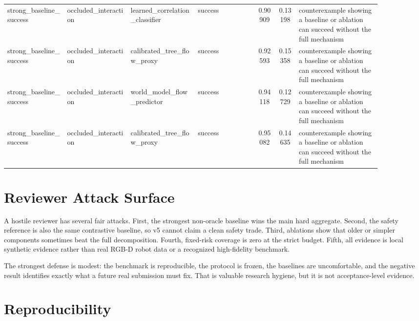 \documentclass{article}
\begin{document}
\begin{center}
\begin{longtable}{p{0.16\linewidth}p{0.17\linewidth}p{0.18\linewidth}p{0.16\linewidth}ccp{0.22\linewidth}}
strong\_baseline\_success & occluded\_interaction & learned\_correlation\_classifier & success & 0.90909 & 0.13198 & counterexample showing a baseline or ablation can succeed without the full mechanism\\
strong\_baseline\_success & occluded\_interaction & calibrated\_tree\_flow\_proxy & success & 0.92593 & 0.15358 & counterexample showing a baseline or ablation can succeed without the full mechanism\\
strong\_baseline\_success & occluded\_interaction & world\_model\_flow\_predictor & success & 0.94118 & 0.12729 & counterexample showing a baseline or ablation can succeed without the full mechanism\\
strong\_baseline\_success & occluded\_interaction & calibrated\_tree\_flow\_proxy & success & 0.95082 & 0.14635 & counterexample showing a baseline or ablation can succeed without the full mechanism\\
\bottomrule
\end{longtable}
\normalsize
\end{center}

\section{Reviewer Attack Surface}

A hostile reviewer has several fair attacks. First, the strongest non-oracle baseline wins the main hard aggregate. Second, the safety reference is also the same contrastive baseline, so v5 cannot claim a clean safety trade. Third, ablations show that older or simpler components sometimes beat the full decomposition. Fourth, fixed-risk coverage is zero at the strict budget. Fifth, all evidence is local synthetic evidence rather than real RGB-D robot data or a recognized high-fidelity benchmark.

The strongest defense is modest: the benchmark is reproducible, the protocol is frozen, the baselines are uncomfortable, and the negative result identifies exactly what a future real submission must fix. That is valuable research hygiene, but it is not acceptance-level evidence.

\section{Reproducibility}
\end{document}
